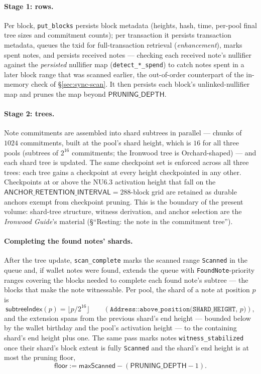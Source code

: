 \documentclass[11pt,a4paper]{article}
\theoremstyle{definition}
\begin{document}
\paragraph{Stage 1: rows.} Per block, \texttt{put\_blocks} persists block
metadata (heights, hash, time, per-pool final tree sizes and commitment
counts); per transaction it persists transaction metadata, queues the txid
for full-transaction retrieval (\emph{enhancement}), marks spent notes, and
persists received notes --- checking each received note's nullifier against
the \emph{persisted} nullifier map (\texttt{detect\_*\_spend}) to catch
notes spent in a later block range that was scanned earlier, the
out-of-order counterpart of the in-memory check of \S\ref{sec:sync-scan}.
It then persists each block's unlinked-nullifier map and prunes the map
beyond $\mathsf{PRUNING\_DEPTH}$.

\paragraph{Stage 2: trees.} Note commitments are assembled into shard
subtrees in parallel --- chunks of $1024$ commitments, built at the pool's
shard height, which is $16$ for all three pools (subtrees of $2^{16}$
commitments; the Ironwood tree is Orchard-shaped) --- and each shard tree
is updated. The same checkpoint set is enforced across all three trees:
each tree gains a checkpoint at every height checkpointed in any other.
Checkpoints at or above the NU6.3 activation height that fall on the
$\mathsf{ANCHOR\_RETENTION\_INTERVAL} = 288$-block grid are retained as
durable anchors exempt from checkpoint pruning. This is the boundary of the
present
volume: shard-tree structure, witness derivation, and anchor selection are
the \emph{Ironwood Guide}'s material (\S``Resting: the note in the commitment tree'').

\paragraph{Completing the found notes' shards.} After the tree update,
\texttt{scan\_complete} marks the scanned range \texttt{Scanned} in the
queue and, if wallet notes were found, extends the queue with
\texttt{FoundNote}-priority ranges covering the blocks needed to complete
each found note's subtree --- the blocks that make the note witnessable.
Per pool, the shard of a note at position $p$ is
\[
\mathsf{subtreeIndex}(p) = \lfloor p / 2^{16} \rfloor
\qquad (\texttt{Address::above\_position(SHARD\_HEIGHT, } p\texttt{)}),
\]
and the extension spans from the previous shard's end height --- bounded
below by the wallet birthday and the pool's activation height --- to the
containing shard's end height plus one. The same pass marks notes
\texttt{witness\_stabilized} once their shard's block extent is fully
\texttt{Scanned} and the shard's end height is at most the pruning floor,
\[
\mathsf{floor} := \mathsf{maxScanned} - (\mathsf{PRUNING\_DEPTH} - 1).
\]
\end{document}
